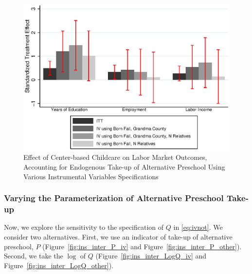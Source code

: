 \begin{figure}[H]
		\caption{Effect of Center-based Childcare on Labor Market Outcomes, Accounting for Endogenous Take-up of Alternative Preschool Using Various Instrumental Variables Specifications} \label{fig:inter_Q_other}
		\includegraphics[width=.8\columnwidth]{output/appendixplots/inter_Q_iv_other.eps}
\end{figure}

\subsubsection{Varying the Parameterization of Alternative Preschool Take-up}

\noindent Now, we explore the sensitivity to the specification of $Q$ in \eqref{eq:ivnot}. We consider two alternatives. First, we use an indicator of take-up of alternative preschool, $P$ (Figure~\ref{fig:ins_inter_P_iv} and Figure~\ref{fig:ins_inter_P_other}). Second, we take the $\log$ of $Q$ (Figure~\ref{fig:ins_inter_LogQ_iv} and Figure~\ref{fig:ins_inter_LogQ_other}).

